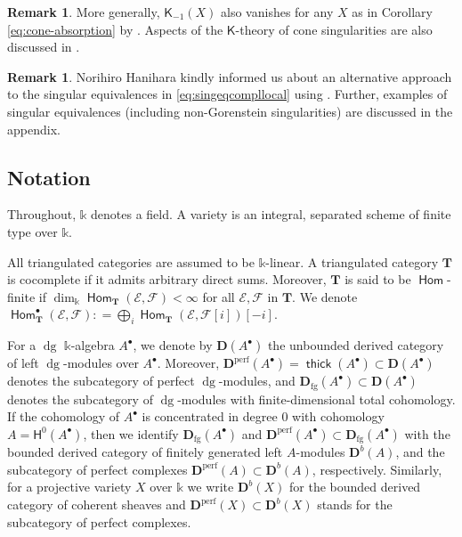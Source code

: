 \documentclass[a4paper,11pt, reqno]{amsart}
\def\DD{\mathbf D}
\def\TT{\mathbf T}
\def\sE{\mathscr{E}}
\def\sF{\mathscr{F}}
\def\dg{{\operatorname{dg}}}
\newcommand{\opname}[1]{\operatorname{\mathsf{#1}}}
\newcommand{\Hom}{\opname{Hom}}
\newcommand{\thick}{\opname{thick}\nolimits}
\def\Db{\DD^b}
\def\Dperf{\DD^{\mathrm{perf}}}
\newcommand{\bH}{\mathsf{H}}
\newcommand{\bK}{\mathsf{K}}
\theoremstyle{plain}
\theoremstyle{definition}
\newtheorem{remark}[dummy]{Remark}
\numberwithin{equation}{section}
\begin{document}
\begin{remark}
More generally, $\bK_{-1}(X)$ also vanishes for any $X$ as in Corollary \ref{eq:cone-absorption} by \cite[Proposition 6.12]{ks2}. 
Aspects of the $\bK$-theory of cone singularities are also discussed in \cite{Cortinasetal}.
\end{remark}

\begin{remark}
    Norihiro Hanihara kindly informed us about an alternative approach to the singular equivalences in \eqref{eq:singeqcompllocal} using \cite{Hanihara1}. Further, examples of singular equivalences (including non-Gorenstein singularities) are discussed in the appendix. 
\end{remark}

\subsection*{Notation} Throughout, $\mathbb{k}$ denotes a field. A variety is an integral, separated scheme of finite type over $\mathbb{k}$.

All triangulated categories are assumed to be $\mathbb{k}$-linear.
A triangulated category $\TT$ is cocomplete if it admits arbitrary direct sums.
Moreover, $\TT$ is said to be $\Hom$-finite if $\dim_{\mathbb{k}}\Hom_{\TT}(\sE,\sF)<\infty$ for all $\sE , \sF$ in $\TT$. 
 We denote $\Hom_{\TT}^{\bullet}( \sE , \sF ) : = \bigoplus_i \Hom_{\TT}(\sE , \sF[i])[-i]$.

For a $\dg$ $\mathbb{k}$-algebra $A^\bullet$, we denote by $\DD ( A^\bullet )$ the unbounded derived category of  left $\dg$-modules over $A^\bullet$.
Moreover, $\Dperf ( A^\bullet ) = \thick ( A^\bullet ) \subset \DD ( A^\bullet )$ denotes the subcategory of perfect $\dg$-modules, and $\DD_{\mathrm{fg}} ( A^\bullet ) \subset \DD ( A^\bullet )$ denotes the subcategory of $\dg$-modules with finite-dimensional total cohomology.
If the cohomology of $A^\bullet $ is concentrated in degree $0$ with cohomology $A = \bH^0 ( A^\bullet  )$, then we identify $\DD_{\mathrm{fg}} ( A^\bullet  )$ and $\Dperf(A^\bullet ) \subset \DD_{\mathrm{fg}} ( A^\bullet )$ with the bounded derived category of finitely generated left $A$-modules $\Db(A)$, and the subcategory of perfect complexes $\Dperf(A ) \subset \Db ( A )$, respectively.
Similarly, for a projective variety $X$ over $\mathbb{k}$ we write $\Db(X)$ for the
bounded derived category of coherent sheaves and $\Dperf(X) \subset \Db(X)$ stands for the subcategory of perfect complexes.
\end{document}

